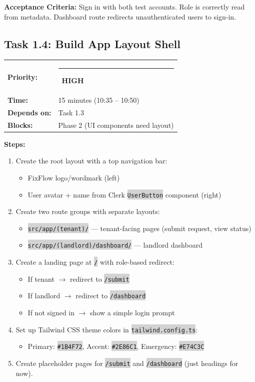 \documentclass[11pt, a4paper]{article}
\newcommand{\highpri}{\textcolor{highamber}{\rule{6pt}{6pt}}~\textcolor{highamber}{\scriptsize\textbf{HIGH}}}
\newcommand{\code}[1]{\texttt{\small\colorbox{lightgray}{#1}}}
\begin{document}
\textbf{Acceptance Criteria:} Sign in with both test accounts. Role is correctly read from metadata. Dashboard route redirects unauthenticated users to sign-in.

\vspace{1em}

\subsection{Task 1.4: Build App Layout Shell}

\begin{tabularx}{\textwidth}{lX}
\textbf{Priority:} & \highpri \\
\textbf{Time:} & 15 minutes (10:35 -- 10:50) \\
\textbf{Depends on:} & Task 1.3 \\
\textbf{Blocks:} & Phase 2 (UI components need layout) \\
\end{tabularx}

\vspace{0.3em}

\textbf{Steps:}
\begin{enumerate}[leftmargin=2em, itemsep=2pt]
  \item Create the root layout with a top navigation bar:
    \begin{itemize}[itemsep=1pt]
      \item FixFlow logo/wordmark (left)
      \item User avatar + name from Clerk \code{UserButton} component (right)
    \end{itemize}
  \item Create two route groups with separate layouts:
    \begin{itemize}[itemsep=1pt]
      \item \code{src/app/(tenant)/} --- tenant-facing pages (submit request, view status)
      \item \code{src/app/(landlord)/dashboard/} --- landlord dashboard
    \end{itemize}
  \item Create a landing page at \code{/} with role-based redirect:
    \begin{itemize}[itemsep=1pt]
      \item If tenant $\rightarrow$ redirect to \code{/submit}
      \item If landlord $\rightarrow$ redirect to \code{/dashboard}
      \item If not signed in $\rightarrow$ show a simple login prompt
    \end{itemize}
  \item Set up Tailwind CSS theme colors in \code{tailwind.config.ts}:
    \begin{itemize}[itemsep=1pt]
      \item Primary: \code{\#1B4F72}, Accent: \code{\#2E86C1}, Emergency: \code{\#E74C3C}
    \end{itemize}
  \item Create placeholder pages for \code{/submit} and \code{/dashboard} (just headings for now).
\end{enumerate}
\end{document}
